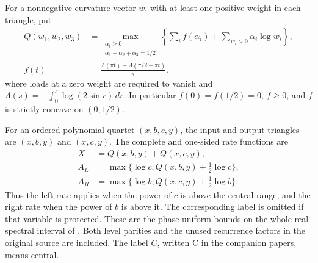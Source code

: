 \documentclass[11pt]{article}
\numberwithin{equation}{section}
\theoremstyle{definition}\newtheorem{definition}[theorem]{Definition}
\theoremstyle{remark}\newtheorem{remark}[theorem]{Remark}
\begin{document}
For a nonnegative curvature vector \(w\), with at least one positive weight in each triangle, put
\begin{equation}\label{ti:eq-1}
\begin{aligned}
Q(w_1,w_2,w_3)&=
\max_{\substack{\alpha_i\ge0\\\alpha_1+\alpha_2+\alpha_3=1/2}}
\left\{\sum_i f(\alpha_i)+\sum_{w_i>0}\alpha_i\log w_i\right\},\\
f(t)&=\frac{\Lambda(\pi t)+\Lambda(\pi/2-\pi t)}{\pi}.
\end{aligned}
\end{equation}
where loads at a zero weight are required to vanish and
\(\Lambda(s)=-\int_0^s\log(2\sin r)\,dr\). In particular \(f(0)=f(1/2)=0\), \(f\ge0\), and \(f\) is strictly concave on \((0,1/2)\).

For an ordered polynomial quartet \((x,b,c,y)\), the input and output triangles are \((x,b,y)\) and \((x,c,y)\). The complete and one-sided rate functions are
\begin{equation}\label{ti:eq-C1}
\begin{aligned}
X&=Q(x,b,y)+Q(x,c,y),\\
A_L&=\max\{\log c,Q(x,b,y)+\tfrac12\log c\},\\
A_R&=\max\{\log b,Q(x,c,y)+\tfrac12\log b\}.
\end{aligned}
\end{equation}
Thus the left rate applies when the power of $c$ is above the central
range, and the right rate when the power of $b$ is above it. The
corresponding label is omitted if that variable is protected. These are the phase-uniform bounds on the whole real spectral interval
of \cite[Theorem 1.1]{CasimirSources}. Both level parities and the unused
recurrence factors in the original source are included. The label
\(C\), written \(\mathrm C\) in the companion papers, means central.
\end{document}
